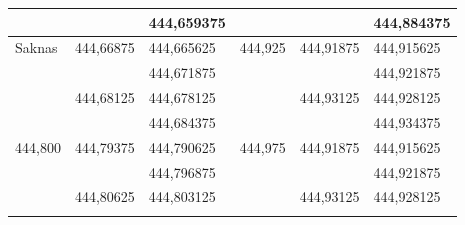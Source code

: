 \begin{table}[H]
\begin{tabular}{|l|l|l|l|l|l|}
		                                               &                                                 & 444,659375                      & \multicolumn{1}{l|}{}                         & \multicolumn{1}{l|}{}                           & \multicolumn{1}{l|}{444,884375} \\ \hline
		\multirow{4}{*}{Saknas}                        & \multirow{2}{*}{444,66875}                      & 444,665625                      & \multicolumn{1}{l|}{\multirow{4}{*}{444,925}} & \multicolumn{1}{l|}{\multirow{2}{*}{444,91875}} & \multicolumn{1}{l|}{444,915625} \\ \cline{3-3}\cline{6-6}
		                                               &                                                 & 444,671875                      & \multicolumn{1}{l|}{}                         & \multicolumn{1}{l|}{}                           & \multicolumn{1}{l|}{444,921875} \\ \cline{2-3}\cline{5-6}
		                                               & \multirow{2}{*}{444,68125}                      & 444,678125                      & \multicolumn{1}{l|}{}                         & \multicolumn{1}{l|}{\multirow{2}{*}{444,93125}} & \multicolumn{1}{l|}{444,928125} \\ \cline{3-3}\cline{6-6}
		                                               &                                                 & 444,684375                      & \multicolumn{1}{l|}{}                         & \multicolumn{1}{l|}{}                           & \multicolumn{1}{l|}{444,934375} \\ \hline
		\multirow{4}{*}{444,800}                       & \multirow{2}{*}{444,79375}                      & 444,790625                      & \multicolumn{1}{l|}{\multirow{4}{*}{444,975}} & \multicolumn{1}{l|}{\multirow{2}{*}{444,91875}} & \multicolumn{1}{l|}{444,915625} \\ \cline{3-3}\cline{6-6}
		                                               &                                                 & 444,796875                      & \multicolumn{1}{l|}{}                         & \multicolumn{1}{l|}{}                           & \multicolumn{1}{l|}{444,921875} \\ \cline{2-3}\cline{5-6}
		                                               & \multirow{2}{*}{444,80625}                      & 444,803125                      & \multicolumn{1}{l|}{}                         & \multicolumn{1}{l|}{\multirow{2}{*}{444,93125}} & \multicolumn{1}{l|}{444,928125} \\ \cline{3-3}\cline{6-6}

\end{tabular}
\end{table}

